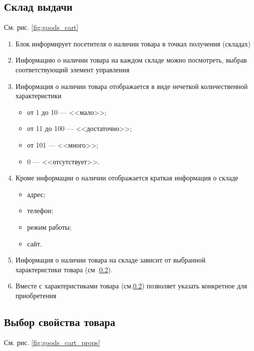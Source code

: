         \subsection{Склад выдачи}\label{sec:goods_cart_stores} 

            См. рис. \ref{fig:goods_cart}

                        
            \begin{enumerate}
                \item Блок информирует посетителя о наличии товара в точках получения (складах)
                \item Информацию о наличии товара на каждом складе можно посмотреть, выбрав соответствующий элемент управления
                \item Информация о наличии товара отображается в виде нечеткой количественной характеристики 
                    \begin{itemize}
                        \item от 1 до 10 --- <<мало>>;
                        \item от 11 до 100 --- <<достаточно>>;
                        \item от 101  --- <<много>>;
                        \item 0  --- <<отсутствует>>.
                    \end{itemize}
                \item Кроме информации о наличии отображается краткая информация о складе
                    \begin{itemize}
                        \item адрес;
                        \item телефон;
                        \item режим работы;
                        \item сайт.
                    \end{itemize}
                \item Информация о наличии товара на складе зависит от выбранной характеристики товара
                    (см .\ref{sec:goods_cart_props}). 
                \item Вместе с характеристиками товара (см.\ref{sec:goods_cart_props}) позволяет указать конкретное 
                    для приобретения
            \end{enumerate}
            
        \subsection{Выбор свойства товара}
            \label{sec:goods_cart_props}
            См. рис. \ref{fig:goods_cart_props}

